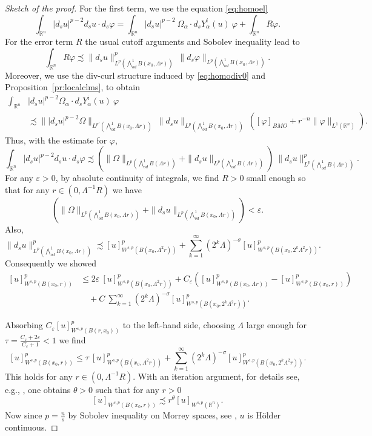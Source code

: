 \documentclass[12pt]{amsart}
\def\eps{\varepsilon}
\theoremstyle{definition}
\newcommand{\R}{\mathbb{R}}
\newcommand{\brac}[1]{\left (#1 \right )}
\newcommand{\Ep}{\bigwedge\nolimits}
\numberwithin{theorem}{section} \numberwithin{equation}{section}
\newcommand{\aleq}{\precsim}
\begin{document}
\begin{proof}[Sketch of the proof]
For the first term, we use the equation \eqref{eq:homoel}
\[
\int_{\R^n} |d_s u|^{p-2} d_s u \cdot d_s \varphi = \int_{\R^n} |d_s u|^{p-2}\ \Omega_\alpha \cdot d_s Y_\alpha^i(u)\ \varphi + \int_{\R^n} R\varphi.
\]
For the error term $R$ the usual cutoff arguments and Sobolev inequality lead to
\[
 \int_{\R^n} R\varphi \aleq \|d_s u\|_{L^p(\Ep^1_{od} B(x_0,\Lambda r))}^{p}\  \|d_s\varphi\|_{L^p(\Ep^1_{od} B(x_0,\Lambda r))}.
\]
Moreover, we use the div-curl structure induced by \eqref{eq:homodiv0} and Proposition~\ref{pr:localclms}, to obtain
\[\begin{split}
  \int_{\R^n} &|d_s u|^{p-2} \Omega_\alpha \cdot d_s Y_\alpha^i(u)\ \varphi\\
  &\aleq \||d_s u|^{p-2} \Omega\|_{L^{p'}(\Ep^1_{od} B(x_0,\Lambda r))}\ \|d_s u\|_{L^{p}(\Ep^1_{od}B(x_0,\Lambda r))}\ \brac{[\varphi]_{BMO} + r^{-n} \|\varphi\|_{L^1(\R^n)}}.
  \end{split}
\]
Thus, with the estimate for $\varphi$,
\[
 \int_{\R^n} |d_s u|^{p-2} d_s u \cdot d_s \varphi \aleq \brac{\|\Omega\|_{L^p(\Ep^1_{od} B(\Lambda r))}+ \|d_s u\|_{L^p(\Ep^1_{od} B(\Lambda r))}}\ \|d_s u\|_{L^p(\Ep^1_{od} B(\Lambda r))}^{p}.
\]
For any $\eps > 0$, by absolute continuity of integrals, we find $R > 0$ small enough so that for any $r \in (0,\Lambda^{-1} R)$ we have
\[
 \brac{\|\Omega\|_{L^p(\Ep^1_{od} B(x_0, \Lambda r))}+ \|d_s u\|_{L^p(\Ep^1_{od} B(x_0, \Lambda r))}} < \eps.
\]
Also,
\[
 \|d_s u\|_{L^p(\Ep^1_{od} B(x_0, \Lambda r))}^{p} \aleq [u]_{W^{s,p}(B(x_0, \Lambda^2 r))}^p + \sum_{k=1}^\infty \brac{2^{k} \Lambda}^{-\sigma} [u]_{W^{s,p}(B(x_0, 2^k\Lambda^2 r))}^p.
\]
Consequently we showed 
\[
 \begin{split}
 [u]^{p}_{W^{s,p}(B(x_0,r))} &\leq  2\eps\ [u]^{p}_{W^{s,p}(B(x_0, \Lambda^2 r))} + C_\eps \brac{[u]^{p}_{W^{s,p}(B(x_0, \Lambda r))} - [u]^{p}_{W^{s,p}(B( x_0,r))}}\\
  &\quad+C\ \sum_{k=1}^\infty \brac{2^{k} \Lambda}^{-\sigma} [u]_{W^{s,p}(B(x_0, 2^k\Lambda^2 r))}^p.
\end{split}
 \]
 
Absorbing $ C_\eps [u]^{p}_{W^{s,p}(B( r,x_0))}$ to the left-hand side, choosing $\Lambda$ large enough for $\tau = \frac{C_\eps + 2\eps}{C_\eps + 1} < 1$ we find
\[
 [u]^{p}_{W^{s,p}(B(x_0,r))} \leq  \tau\ [u]^{p}_{W^{s,p}(B(x_0, \Lambda^2 r))} +\sum_{k=1}^\infty \brac{2^{k} \Lambda}^{-\sigma}  [u]_{W^{s,p}(B(x_0,2^k \Lambda^2 r))}^p.
 \]
This holds for any $r \in (0,\Lambda^{-1} R)$. With an iteration argument, for details see, e.g., \cite[Lemma A.8]{Blatt-Reiter-Schikorra-2016}, one obtains $\theta > 0$ such that for any $r > 0$
\[
 [u]_{W^{s,p}(B(x_0,r))}  \aleq r^{\theta} [u]_{W^{s,p}(\R^n)}.
\]
Now since $p=\frac{n}{s}$ by Sobolev inequality on Morrey spaces, see \cite{Adams-1975}, $u$ is H\"older continuous.
\end{proof}
% 
% 
% 
% 
% 
% 
% 
\end{document}
